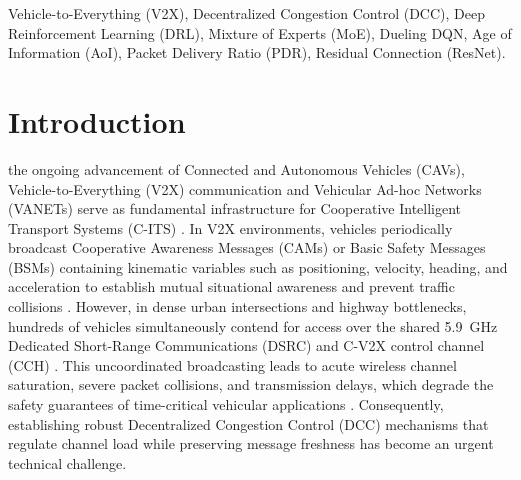 \documentclass[journal]{IEEEtran}
\begin{document}
\begin{IEEEkeywords}
Vehicle-to-Everything (V2X), Decentralized Congestion Control (DCC), Deep Reinforcement Learning (DRL), Mixture of Experts (MoE), Dueling DQN, Age of Information (AoI), Packet Delivery Ratio (PDR), Residual Connection (ResNet).
\end{IEEEkeywords}

\IEEEpeerreviewmaketitle

\section{Introduction}
 the ongoing advancement of Connected and Autonomous Vehicles (CAVs), Vehicle-to-Everything (V2X) communication and Vehicular Ad-hoc Networks (VANETs) serve as fundamental infrastructure for Cooperative Intelligent Transport Systems (C-ITS) \cite{Arena2019Overview, Kenney2011DSRC}. In V2X environments, vehicles periodically broadcast Cooperative Awareness Messages (CAMs) or Basic Safety Messages (BSMs) containing kinematic variables such as positioning, velocity, heading, and acceleration to establish mutual situational awareness and prevent traffic collisions \cite{ETSI_EN_302_637_2, SAE_J2945_1}. However, in dense urban intersections and highway bottlenecks, hundreds of vehicles simultaneously contend for access over the shared 5.9~GHz Dedicated Short-Range Communications (DSRC) and C-V2X control channel (CCH) \cite{ETSI_TS_102_687}. This uncoordinated broadcasting leads to acute wireless channel saturation, severe packet collisions, and transmission delays, which degrade the safety guarantees of time-critical vehicular applications \cite{Zheng2022Age, Liu2024Age}. Consequently, establishing robust Decentralized Congestion Control (DCC) mechanisms that regulate channel load while preserving message freshness has become an urgent technical challenge.
\end{document}

